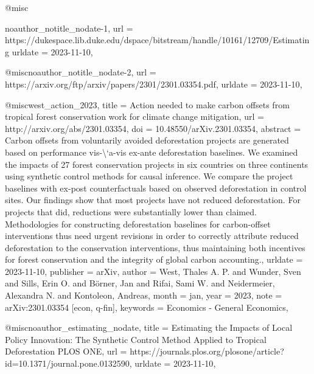 @misc{noauthor_notitle_nodate-1,
	url = {https://dukespace.lib.duke.edu/dspace/bitstream/handle/10161/12709/Estimating%
	urldate = {2023-11-10},
}

@misc{noauthor_notitle_nodate-2,
	url = {https://arxiv.org/ftp/arxiv/papers/2301/2301.03354.pdf},
	urldate = {2023-11-10},
}

@misc{west_action_2023,
	title = {Action needed to make carbon offsets from tropical forest conservation work for climate change mitigation},
	url = {http://arxiv.org/abs/2301.03354},
	doi = {10.48550/arXiv.2301.03354},
	abstract = {Carbon offsets from voluntarily avoided deforestation projects are generated based on performance vis-{\textbackslash}`a-vis ex-ante deforestation baselines. We examined the impacts of 27 forest conservation projects in six countries on three continents using synthetic control methods for causal inference. We compare the project baselines with ex-post counterfactuals based on observed deforestation in control sites. Our findings show that most projects have not reduced deforestation. For projects that did, reductions were substantially lower than claimed. Methodologies for constructing deforestation baselines for carbon-offset interventions thus need urgent revisions in order to correctly attribute reduced deforestation to the conservation interventions, thus maintaining both incentives for forest conservation and the integrity of global carbon accounting.},
	urldate = {2023-11-10},
	publisher = {arXiv},
	author = {West, Thales A. P. and Wunder, Sven and Sills, Erin O. and Börner, Jan and Rifai, Sami W. and Neidermeier, Alexandra N. and Kontoleon, Andreas},
	month = jan,
	year = {2023},
	note = {arXiv:2301.03354 [econ, q-fin]},
	keywords = {Economics - General Economics},
}

@misc{noauthor_estimating_nodate,
	title = {Estimating the {Impacts} of {Local} {Policy} {Innovation}: {The} {Synthetic} {Control} {Method} {Applied} to {Tropical} {Deforestation} {\textbar} {PLOS} {ONE}},
	url = {https://journals.plos.org/plosone/article?id=10.1371/journal.pone.0132590},
	urldate = {2023-11-10},
}

}
